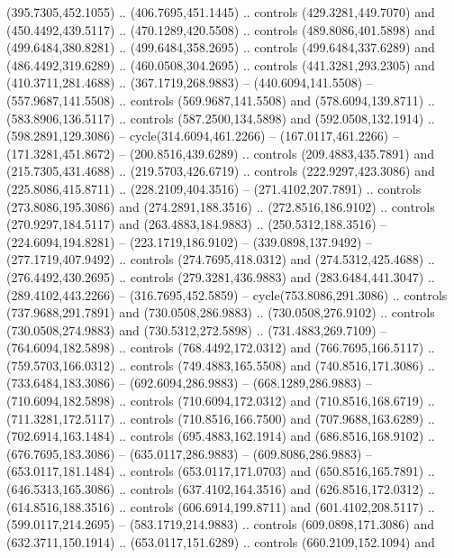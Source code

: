 {{\begin{scope}[x=0.80pt,y=-0.80pt,scale=0.038,xshift=-450pt,yshift=360pt]
        (395.7305,452.1055) .. (406.7695,451.1445) .. controls (429.3281,449.7070) and
        (450.4492,439.5117) .. (470.1289,420.5508) .. controls (489.8086,401.5898) and
        (499.6484,380.8281) .. (499.6484,358.2695) .. controls (499.6484,337.6289) and
        (486.4492,319.6289) .. (460.0508,304.2695) .. controls (441.3281,293.2305) and
        (410.3711,281.4688) .. (367.1719,268.9883) -- (440.6094,141.5508) --
        (557.9687,141.5508) .. controls (569.9687,141.5508) and (578.6094,139.8711) ..
        (583.8906,136.5117) .. controls (587.2500,134.5898) and (592.0508,132.1914) ..
        (598.2891,129.3086) -- cycle(314.6094,461.2266) -- (167.0117,461.2266) --
        (171.3281,451.8672) -- (200.8516,439.6289) .. controls (209.4883,435.7891) and
        (215.7305,431.4688) .. (219.5703,426.6719) .. controls (222.9297,423.3086) and
        (225.8086,415.8711) .. (228.2109,404.3516) -- (271.4102,207.7891) .. controls
        (273.8086,195.3086) and (274.2891,188.3516) .. (272.8516,186.9102) .. controls
        (270.9297,184.5117) and (263.4883,184.9883) .. (250.5312,188.3516) --
        (224.6094,194.8281) -- (223.1719,186.9102) -- (339.0898,137.9492) --
        (277.1719,407.9492) .. controls (274.7695,418.0312) and (274.5312,425.4688) ..
        (276.4492,430.2695) .. controls (279.3281,436.9883) and (283.6484,441.3047) ..
        (289.4102,443.2266) -- (316.7695,452.5859) -- cycle(753.8086,291.3086) ..
        controls (737.9688,291.7891) and (730.0508,286.9883) .. (730.0508,276.9102) ..
        controls (730.0508,274.9883) and (730.5312,272.5898) .. (731.4883,269.7109) --
        (764.6094,182.5898) .. controls (768.4492,172.0312) and (766.7695,166.5117) ..
        (759.5703,166.0312) .. controls (749.4883,165.5508) and (740.8516,171.3086) ..
        (733.6484,183.3086) -- (692.6094,286.9883) -- (668.1289,286.9883) --
        (710.6094,182.5898) .. controls (710.6094,172.0312) and (710.8516,168.6719) ..
        (711.3281,172.5117) .. controls (710.8516,166.7500) and (707.9688,163.6289) ..
        (702.6914,163.1484) .. controls (695.4883,162.1914) and (686.8516,168.9102) ..
        (676.7695,183.3086) -- (635.0117,286.9883) -- (609.8086,286.9883) --
        (653.0117,181.1484) .. controls (653.0117,171.0703) and (650.8516,165.7891) ..
        (646.5313,165.3086) .. controls (637.4102,164.3516) and (626.8516,172.0312) ..
        (614.8516,188.3516) .. controls (606.6914,199.8711) and (601.4102,208.5117) ..
        (599.0117,214.2695) -- (583.1719,214.9883) .. controls (609.0898,171.3086) and
        (632.3711,150.1914) .. (653.0117,151.6289) .. controls (660.2109,152.1094) and

\end{scope}}}
